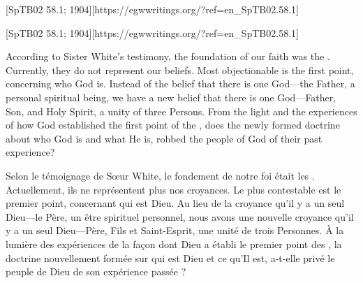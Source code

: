 [SpTB02 58.1; 1904][https://egwwritings.org/?ref=en\_SpTB02.58.1]


[SpTB02 58.1; 1904][https://egwwritings.org/?ref=en\_SpTB02.58.1]


According to Sister White’s testimony, the foundation of our faith was the . Currently, they do not represent our beliefs. Most objectionable is the first point, concerning who God is. Instead of the belief that there is one God—the Father, a personal spiritual being, we have a new belief that there is one God—Father, Son, and Holy Spirit, a unity of three Persons. From the light and the experiences of how God established the first point of the , does the newly formed doctrine about who God is and what He is, robbed the people of God of their past experience?


Selon le témoignage de Sœur White, le fondement de notre foi était les . Actuellement, ils ne représentent plus nos croyances. Le plus contestable est le premier point, concernant qui est Dieu. Au lieu de la croyance qu'il y a un seul Dieu—le Père, un être spirituel personnel, nous avons une nouvelle croyance qu'il y a un seul Dieu—Père, Fils et Saint-Esprit, une unité de trois Personnes. À la lumière des expériences de la façon dont Dieu a établi le premier point des , la doctrine nouvellement formée sur qui est Dieu et ce qu'Il est, a-t-elle privé le peuple de Dieu de son expérience passée ?


